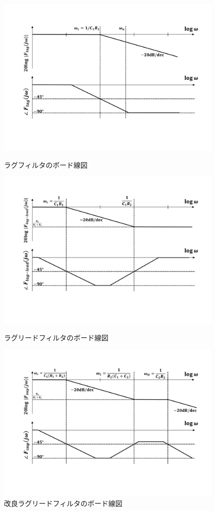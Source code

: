 \begin{figure}[p]
\begin{center}

\vspace{-1cm}

\includegraphics[width=110mm]{figures/lag.pdf}
\caption{ラグフィルタのボード線図}
\label{lag}

\vspace{1cm}

\includegraphics[width=110mm]{figures/lead.pdf}
\caption{ラグリードフィルタのボード線図}
\label{lead}

\vspace{1cm}

\includegraphics[width=110mm]{figures/lag-lead.pdf}
\caption{改良ラグリードフィルタのボード線図}
\label{lag-lead}

\end{center}
\end{figure}



